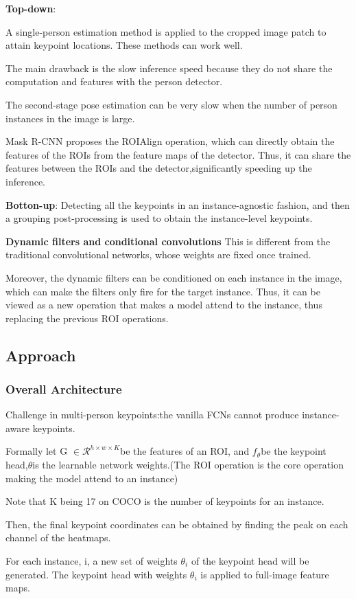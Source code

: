 \documentclass[11pt]{article}
\begin{document}
\textbf{Top-down}:

A single-person estimation method is applied to the cropped image patch to attain keypoint locations. These methods can work well. 

The main drawback is the slow inference speed because they do not share the computation and features with the person detector.

The second-stage pose estimation can be very slow when the number of person instances in the image is large.

Mask R-CNN proposes the ROIAlign operation, which can directly obtain the features of the ROIs from the feature maps of the detector. Thus, it can share the features between the ROIs and the detector,significantly speeding up the inference.

\textbf{Botton-up}:
Detecting all the keypoints in an instance-agnostic fashion, and then a grouping post-processing is used to obtain the instance-level keypoints.

\textbf{Dynamic filters and conditional convolutions}
This is different from the traditional convolutional networks, whose weights are fixed once trained.

Moreover, the dynamic filters can be conditioned on each instance in the image, which can make
the filters only fire for the target instance. Thus, it can be viewed as a new operation that makes a model attend to the instance, thus replacing the previous ROI operations.

\subsection{Approach}
\subsubsection{Overall Architecture}
Challenge in multi-person keypoints:the vanilla FCNs cannot produce instance-aware keypoints.

Formally let G $\in \mathcal{R}^{h\times w\times K}$be the features of an ROI, and $f_\theta$be the keypoint head,$\theta$is the learnable network weights.(The ROI operation is the core operation making the model attend to an instance)

Note that K being 17 on COCO is the number of keypoints for an instance.

Then, the final keypoint coordinates can be obtained by finding the peak on each channel of the
heatmaps.

For each instance, i, a new set of weights $\theta_i$ of the keypoint head will be generated. The
keypoint head with weights $\theta_i$ is applied to full-image feature maps.
\end{document}
